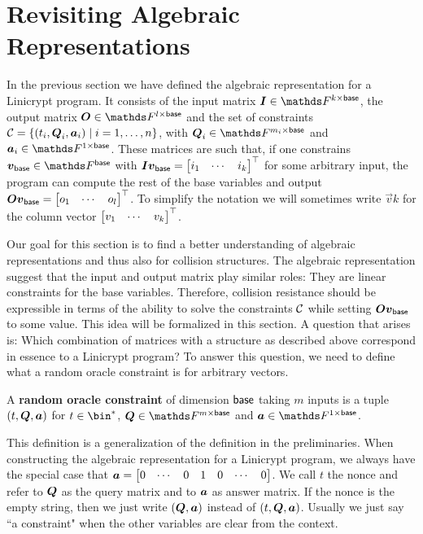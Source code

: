 \chapter{Revisiting Algebraic Representations}
\label{revisiting_algebraic_representations}

In the previous section we have defined the algebraic representation for a Linicrypt program.
It consists of the input matrix $\Inp \in \F^{k \times \base}$,
the output matrix $\O \in \F^{l \times \base}$
and the set of constraints $\mathcal{C} = \{ (t_i, \boldsymbol{Q}_i, \boldsymbol a_i) \mid i = 1, \dots, n \}$,
with $\Q_i \in \F^{m_i \times \base}$ and $\va_i \in \F^{1 \times \base}$.
These matrices are such that,
if one constrains $\vbase \in \Fsp$ with $\boldsymbol{I}\boldsymbol v_{\mathsf{base}} = \begin{bmatrix}i_1 & \cdots & i_k\end{bmatrix}^\top$ for some arbitrary input,
the program can compute the rest of the base variables and output $\boldsymbol{O} \boldsymbol v_{\mathsf{base}} = \begin{bmatrix}o_1 & \cdots & o_l\end{bmatrix}^\top$.
To simplify the notation we will sometimes write $\vec v k$ for the column vector $\begin{bmatrix}v_1 & \cdots & v_k\end{bmatrix}^\top$.

Our goal for this section is to find a better understanding of algebraic representations and thus also for collision structures.
The algebraic representation suggest
that the input and output matrix play similar roles:
They are linear constraints for the base variables. 
Therefore, collision resistance should be expressible in terms of the ability to solve the constraints $\mathcal{C}$ while setting $\boldsymbol{O}\boldsymbol v_{\mathsf{base}}$ to some value.  
This idea will be formalized in this section.
A question that arises is:
Which combination of matrices with a structure as described above correspond in essence to a Linicrypt program?
To answer this question,
we need to define what a random oracle constraint is for arbitrary vectors.

\begin{defn}
A \textbf{random oracle constraint} of dimension $\mathsf{base}$ taking $m$ inputs is a tuple $(t, \boldsymbol Q, \boldsymbol a)$ for
$t \in \bin^*$, $\Q \in \F^{m \times \base}$ and $\va \in \F^{1 \times \base}$.
\end{defn}

This definition is a generalization of the definition in the preliminaries.
When constructing the algebraic representation for a Linicrypt program,
we always have the special case that $\boldsymbol a = \begin{bmatrix}0&\cdots&0&1&0&\cdots&0\end{bmatrix}$.
We call $t$ the nonce and refer to $\boldsymbol{Q}$ as the query matrix and to $\boldsymbol a$ as answer matrix.
If the nonce is the empty string, then we just write $(\boldsymbol{Q}, \boldsymbol a)$ instead of $(t, \boldsymbol{Q}, \boldsymbol a)$.
Usually we just say ``a constraint" when the other variables are clear from the context.

